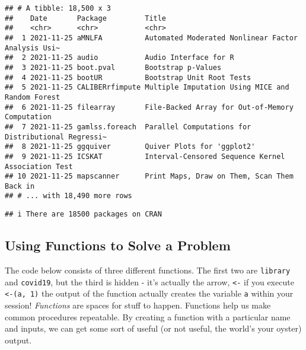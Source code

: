 \documentclass[
]{book}
\newenvironment{Shaded}{\begin{snugshade}}{\end{snugshade}}
\newcommand{\FunctionTok}[1]{\textcolor[rgb]{0.00,0.00,0.00}{#1}}
\newcommand{\NormalTok}[1]{#1}
\newcommand{\OtherTok}[1]{\textcolor[rgb]{0.56,0.35,0.01}{#1}}
\newcommand{\SpecialCharTok}[1]{\textcolor[rgb]{0.00,0.00,0.00}{#1}}
\newcommand{\StringTok}[1]{\textcolor[rgb]{0.31,0.60,0.02}{#1}}
\begin{document}
\begin{verbatim}
## # A tibble: 18,500 x 3
##    Date       Package         Title                                             
##    <chr>      <chr>           <chr>                                             
##  1 2021-11-25 aMNLFA          Automated Moderated Nonlinear Factor Analysis Usi~
##  2 2021-11-25 audio           Audio Interface for R                             
##  3 2021-11-25 boot.pval       Bootstrap p-Values                                
##  4 2021-11-25 bootUR          Bootstrap Unit Root Tests                         
##  5 2021-11-25 CALIBERrfimpute Multiple Imputation Using MICE and Random Forest  
##  6 2021-11-25 filearray       File-Backed Array for Out-of-Memory Computation   
##  7 2021-11-25 gamlss.foreach  Parallel Computations for Distributional Regressi~
##  8 2021-11-25 ggquiver        Quiver Plots for 'ggplot2'                        
##  9 2021-11-25 ICSKAT          Interval-Censored Sequence Kernel Association Test
## 10 2021-11-25 mapscanner      Print Maps, Draw on Them, Scan Them Back in       
## # ... with 18,490 more rows
\end{verbatim}

\begin{Shaded}
\end{Shaded}

\begin{verbatim}
## i There are 18500 packages on CRAN
\end{verbatim}

\hypertarget{using-functions-to-solve-a-problem}{%
\subsection{Using Functions to Solve a Problem}\label{using-functions-to-solve-a-problem}}

The code below consists of three different functions. The first two are \texttt{library} and \texttt{covid19}, but the third is hidden - it's actually the arrow, \texttt{\textless{}-} if you execute \texttt{\textasciigrave{}\textless{}-\textasciigrave{}(a,\ 1)} the output of the function actually creates the variable \texttt{a} within your session! \emph{Functions} are spaces for stuff to happen. Functions help us make common procedures repeatable. By creating a function with a particular name and inputs, we can get some sort of useful (or not useful, the world's your oyster) output.
\end{document}
